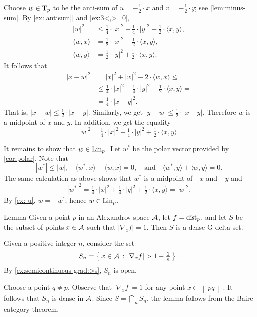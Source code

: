 Choose $w\in \mathrm{T}_p$ to be the anti-sum of $u=-\tfrac{1}{2}\cdot x$ and $v=-\tfrac{1}{2}\cdot y$;
see \ref{lem:minus-sum}.
By \ref{ex:|antisum|} and \ref{ex:3<,>=0},
\begin{align*}
|w|^2&\le \tfrac14\cdot |x|^2+\tfrac14\cdot|y|^2+\tfrac12\cdot\langle x,y\rangle,
\\
\langle w,x\rangle&= \tfrac12\cdot|x|^2+\tfrac12\cdot\langle x,y\rangle,
\\
\langle w,y\rangle&= \tfrac12\cdot|y|^2+\tfrac12\cdot\langle x,y\rangle.
\end{align*}
It follows that 
\begin{align*}
|x-w|^2
&= |x|^2+|w|^2-2\cdot\langle w,x\rangle\le
\\
&\le \tfrac14\cdot |x|^2+\tfrac14\cdot|y|^2-\tfrac12\cdot\langle x,y\rangle=
\\
&=\tfrac14\cdot|x-y|^2.
\end{align*}
That is, $|x-w|\le \tfrac12\cdot|x-y|$.
Similarly, we get $|y-w|\le \tfrac12\cdot|x-y|$.
Therefore $w$ is a midpoint of $x$ and $y$.
In addition, we get the equality 
\[|w|^2= \tfrac14\cdot |x|^2+\tfrac14\cdot|y|^2+\tfrac12\cdot\langle x,y\rangle.\]

It remains to show that $w\in\mathop{\rm Lin}\nolimits_p$.
Let $w^*$ be the polar vector provided by \ref{cor:polar}.
Note that 
\[|w^*|\le |w|,
\quad
\langle w^*,x\rangle+\langle w,x\rangle=0,
\quad\text{and}\quad
\langle w^*,y\rangle+\langle w,y\rangle=0.
\]
The same calculation as above shows that $w^*$ is a midpoint of $-x$ and $-y$ and 
\[|w^*|^2= \tfrac14\cdot |x|^2+\tfrac14\cdot|y|^2+\tfrac12\cdot\langle x,y\rangle=|w|^2.\]
By \ref{ex:-u}, $w=-w^*$;
hence $w\in\mathop{\rm Lin}\nolimits_p$.
\qeds

\begin{thm}{Lemma}\label{ex:grad-dist:G-delta}
Given a point $p$ in an Alexandrov space $\mathcal{A}$,
let $f=\mathrm{dist}_p$, and let $S$ be the subset of points $x\in\mathcal{A}$ such that $|\nabla_xf|=1$.
Then $S$ is a dense G-delta set.

\end{thm}

Given a positive integer $n$, consider the set
\[S_n=\set{x\in\spc{A}}{|\nabla_xf|>1-\tfrac1n}.\]
By \ref{ex:semicontinuous-grad:>s}, $S_n$ is open.

Choose a point $q\ne p$.
Observe that $|\nabla_xf|=1$ for any point $x\in\left]pq\right[$.
It follows that $S_n$ is dense in $\mathcal{A}$.
Since $S=\bigcap_nS_n$, the lemma follows from the Baire category theorem.
\qeds


